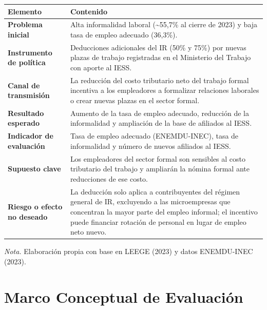 \documentclass[12pt,spanish]{article}
\newcounter{none}
\begin{document}
{\def\LTcaptype{none} %
\begin{longtable}[]{@{}
  >{\raggedright\arraybackslash}p{}
  >{\raggedright\arraybackslash}p{}@{}}
\toprule\noalign{}
\begin{minipage}[b]{\linewidth}\raggedright
Elemento
\end{minipage} & \begin{minipage}[b]{\linewidth}\raggedright
Contenido
\end{minipage} \\
\midrule\noalign{}
\endhead
\bottomrule\noalign{}
\endlastfoot
\textbf{Problema inicial} & Alta informalidad laboral
(\textasciitilde55,7\% al cierre de 2023) y baja tasa de empleo adecuado
(36,3\%). \\
\textbf{Instrumento de política} & Deducciones adicionales del IR (50\%
y 75\%) por nuevas plazas de trabajo registradas en el Ministerio del
Trabajo con aporte al IESS. \\
\textbf{Canal de transmisión} & La reducción del costo tributario neto
del trabajo formal incentiva a los empleadores a formalizar relaciones
laborales o crear nuevas plazas en el sector formal. \\
\textbf{Resultado esperado} & Aumento de la tasa de empleo adecuado,
reducción de la informalidad y ampliación de la base de afiliados al
IESS. \\
\textbf{Indicador de evaluación} & Tasa de empleo adecuado
(ENEMDU-INEC), tasa de informalidad y número de nuevos afiliados al
IESS. \\
\textbf{Supuesto clave} & Los empleadores del sector formal son
sensibles al costo tributario del trabajo y ampliarán la nómina formal
ante reducciones de ese costo. \\
\textbf{Riesgo o efecto no deseado} & La deducción solo aplica a
contribuyentes del régimen general de IR, excluyendo a las microempresas
que concentran la mayor parte del empleo informal; el incentivo puede
financiar rotación de personal en lugar de empleo neto nuevo. \\
\end{longtable}
}

\emph{Nota.} Elaboración propia con base en LEEGE (2023) y datos
ENEMDU-INEC (2023).

\section{Marco Conceptual de
Evaluación}\label{marco-conceptual-de-evaluaciuxf3n}
\end{document}
